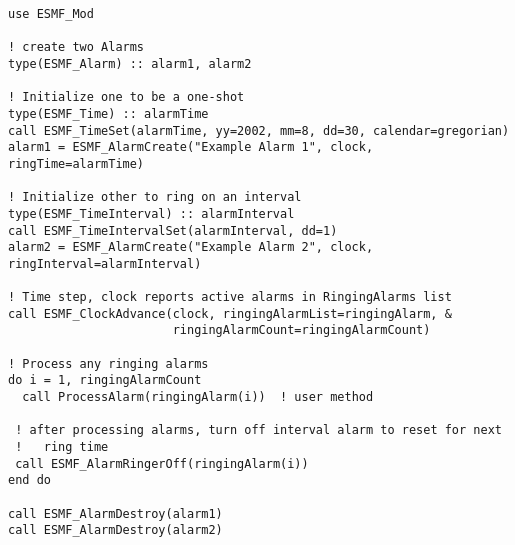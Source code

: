 
\begin{verbatim}
use ESMF_Mod

! create two Alarms
type(ESMF_Alarm) :: alarm1, alarm2

! Initialize one to be a one-shot
type(ESMF_Time) :: alarmTime
call ESMF_TimeSet(alarmTime, yy=2002, mm=8, dd=30, calendar=gregorian)
alarm1 = ESMF_AlarmCreate("Example Alarm 1", clock, ringTime=alarmTime)

! Initialize other to ring on an interval
type(ESMF_TimeInterval) :: alarmInterval
call ESMF_TimeIntervalSet(alarmInterval, dd=1)
alarm2 = ESMF_AlarmCreate("Example Alarm 2", clock, ringInterval=alarmInterval)

! Time step, clock reports active alarms in RingingAlarms list
call ESMF_ClockAdvance(clock, ringingAlarmList=ringingAlarm, &
                       ringingAlarmCount=ringingAlarmCount)

! Process any ringing alarms
do i = 1, ringingAlarmCount
  call ProcessAlarm(ringingAlarm(i))  ! user method

 ! after processing alarms, turn off interval alarm to reset for next
 !   ring time
 call ESMF_AlarmRingerOff(ringingAlarm(i))
end do

call ESMF_AlarmDestroy(alarm1)
call ESMF_AlarmDestroy(alarm2)
\end{verbatim}
